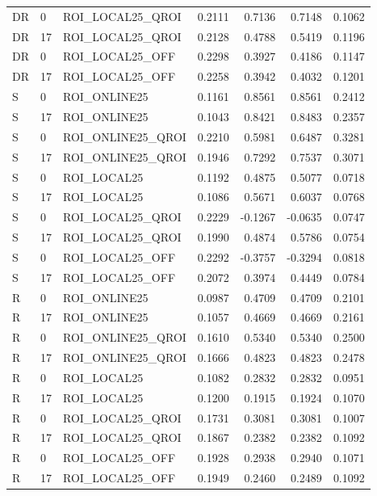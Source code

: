 \begin{longtable}{llp{.29\linewidth}rrrr}
DR & 0 & ROI\_LOCAL25\_QROI & 0.2111 & 0.7136 & 0.7148 & 0.1062 \\
DR & 17 & ROI\_LOCAL25\_QROI & 0.2128 & 0.4788 & 0.5419 & 0.1196 \\
DR & 0 & ROI\_LOCAL25\_OFF & 0.2298 & 0.3927 & 0.4186 & 0.1147 \\
DR & 17 & ROI\_LOCAL25\_OFF & 0.2258 & 0.3942 & 0.4032 & 0.1201 \\
S & 0 & ROI\_ONLINE25 & 0.1161 & 0.8561 & 0.8561 & 0.2412 \\
S & 17 & ROI\_ONLINE25 & 0.1043 & 0.8421 & 0.8483 & 0.2357 \\
S & 0 & ROI\_ONLINE25\_QROI & 0.2210 & 0.5981 & 0.6487 & 0.3281 \\
S & 17 & ROI\_ONLINE25\_QROI & 0.1946 & 0.7292 & 0.7537 & 0.3071 \\
S & 0 & ROI\_LOCAL25 & 0.1192 & 0.4875 & 0.5077 & 0.0718 \\
S & 17 & ROI\_LOCAL25 & 0.1086 & 0.5671 & 0.6037 & 0.0768 \\
S & 0 & ROI\_LOCAL25\_QROI & 0.2229 & -0.1267 & -0.0635 & 0.0747 \\
S & 17 & ROI\_LOCAL25\_QROI & 0.1990 & 0.4874 & 0.5786 & 0.0754 \\
S & 0 & ROI\_LOCAL25\_OFF & 0.2292 & -0.3757 & -0.3294 & 0.0818 \\
S & 17 & ROI\_LOCAL25\_OFF & 0.2072 & 0.3974 & 0.4449 & 0.0784 \\
R & 0 & ROI\_ONLINE25 & 0.0987 & 0.4709 & 0.4709 & 0.2101 \\
R & 17 & ROI\_ONLINE25 & 0.1057 & 0.4669 & 0.4669 & 0.2161 \\
R & 0 & ROI\_ONLINE25\_QROI & 0.1610 & 0.5340 & 0.5340 & 0.2500 \\
R & 17 & ROI\_ONLINE25\_QROI & 0.1666 & 0.4823 & 0.4823 & 0.2478 \\
R & 0 & ROI\_LOCAL25 & 0.1082 & 0.2832 & 0.2832 & 0.0951 \\
R & 17 & ROI\_LOCAL25 & 0.1200 & 0.1915 & 0.1924 & 0.1070 \\
R & 0 & ROI\_LOCAL25\_QROI & 0.1731 & 0.3081 & 0.3081 & 0.1007 \\
R & 17 & ROI\_LOCAL25\_QROI & 0.1867 & 0.2382 & 0.2382 & 0.1092 \\
R & 0 & ROI\_LOCAL25\_OFF & 0.1928 & 0.2938 & 0.2940 & 0.1071 \\
R & 17 & ROI\_LOCAL25\_OFF & 0.1949 & 0.2460 & 0.2489 & 0.1092 \\
\hline\end{longtable}
\endgroup

